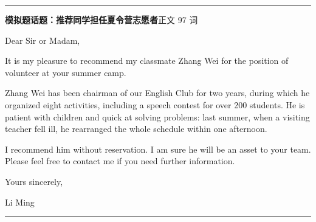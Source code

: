 \documentclass[10pt,a4paper]{ctexart}
\begin{document}
{\color{rule}\rule{\linewidth}{0.6pt}}\par\nopagebreak
\vspace{1pt}
\vspace{2pt}\noindent\colorbox{soft}{\parbox{\dimexpr\linewidth-2\fboxsep\relax}{%
\vspace{2pt}
{\footnotesize\bfseries\color{accent}模拟题话题：推荐同学担任夏令营志愿者}\hfill{\footnotesize\color{gray}正文 97 词}
\par\vspace{2pt}
\footnotesize Dear Sir or Madam,\par
\footnotesize It is my pleasure to recommend my classmate Zhang Wei for the position of volunteer at your summer camp.\par
\footnotesize Zhang Wei has been chairman of our English Club for two years, during which he organized eight activities, including a speech contest for over 200 students. He is patient with children and quick at solving problems: last summer, when a visiting teacher fell ill, he rearranged the whole schedule within one afternoon.\par
\footnotesize I recommend him without reservation. I am sure he will be an asset to your team. Please feel free to contact me if you need further information.\par
\footnotesize Yours sincerely,\par
\footnotesize Li Ming\par
\par{}
\par\vspace{1pt}}}\par
\vspace{2pt}
\vspace{4pt}\par\nopagebreak
{\color{rule}\rule{\linewidth}{0.6pt}}\par\nopagebreak
\vspace{1pt}
\vspace{1pt}\begingroup\setlength{\parindent}{0pt}
\end{document}
